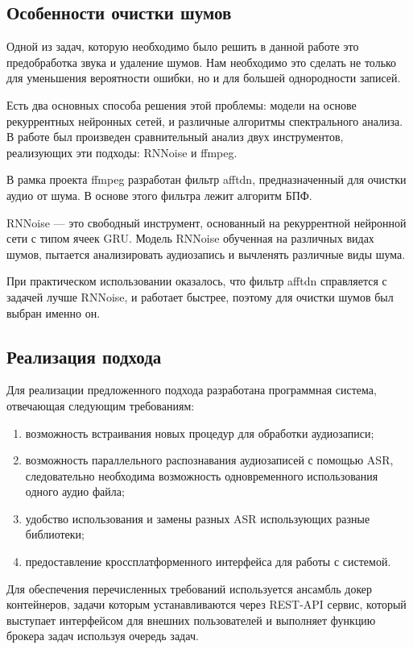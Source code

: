 \documentclass[conference]{IEEEtran}
\begin{document}
\subsection{Особенности очистки шумов}
Одной из задач, которую необходимо было решить в данной работе это предобработка звука и удаление шумов. Нам необходимо это сделать не только для уменьшения вероятности ошибки, но и для большей однородности записей.

Есть два основных способа решения этой проблемы: модели на основе рекуррентных нейронных сетей, и различные алгоритмы спектрального анализа.
В работе был произведен сравнительный анализ двух инструментов, реализующих эти подходы: RNNoise и ffmpeg.

В рамка проекта ffmpeg разработан фильтр afftdn, предназначенный для очистки аудио от шума. В основе этого фильтра лежит алгоритм БПФ.

RNNoise — это свободный инструмент, основанный на рекуррентной нейронной сети с типом ячеек GRU. Модель RNNoise обученная на различных видах шумов, пытается анализировать аудиозапись и вычленять различные виды шума.

При практическом использовании оказалось, что фильтр afftdn справляется с задачей лучше RNNoise, и работает быстрее, поэтому для очистки шумов был выбран именно он.

\subsection{Реализация подхода}

Для реализации предложенного подхода разработана программная система, отвечающая следующим требованиям:

\begin{enumerate}
\item возможность встраивания новых процедур для обработки аудиозаписи;
\item возможность параллельного распознавания аудиозаписей с помощью ASR, следовательно необходима возможность одновременного использования одного аудио файла;
\item удобство использования и замены разных ASR использующих разные библиотеки;
\item предоставление кроссплатформенного интерфейса для работы с системой.
\end{enumerate}

Для обеспечения перечисленных требований используется ансамбль докер контейнеров, задачи которым устанавливаются через REST-API сервис,
который выступает интерфейсом для внешних пользователей и выполняет функцию брокера задач используя очередь задач.
\end{document}
